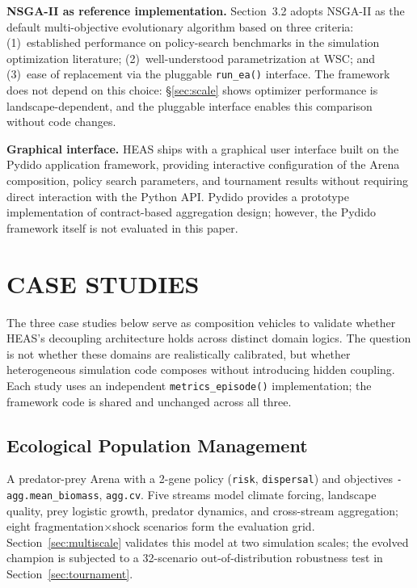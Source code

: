 \documentclass{wscpaperproc}
\begin{document}
\textbf{NSGA-II as reference implementation.} Section~3.2 adopts NSGA-II as the
default multi-objective evolutionary algorithm based on three criteria:
(1)~established performance on policy-search benchmarks in the simulation
optimization literature; (2)~well-understood parametrization at WSC; and
(3)~ease of replacement via the pluggable \texttt{run\_ea()} interface. The
framework does not depend on this choice: \S\ref{sec:scale} shows optimizer performance is landscape-dependent, and the pluggable interface enables this comparison without code changes.

\textbf{Graphical interface.} HEAS ships with a graphical user interface
built on the Pydido application framework, providing interactive configuration
of the Arena composition, policy search parameters, and tournament results
without requiring direct interaction with the Python API.
Pydido provides a prototype implementation of contract-based aggregation design;
however, the Pydido framework itself is not evaluated in this paper.

\section{CASE STUDIES}

The three case studies below serve as composition vehicles to validate whether HEAS's decoupling architecture holds across distinct domain logics. The question is not whether these domains are realistically calibrated, but whether heterogeneous simulation code composes without introducing hidden coupling. Each study uses an independent \texttt{metrics\_episode()} implementation; the framework code is shared and unchanged across all three.

\subsection{Ecological Population Management}

A predator-prey Arena with a 2-gene policy (\texttt{risk},
\texttt{dispersal}) and objectives \texttt{-agg.mean\_biomass},
\texttt{agg.cv}. Five streams model climate forcing, landscape quality, prey
logistic growth, predator dynamics, and cross-stream aggregation; eight
fragmentation$\times$shock scenarios form the evaluation grid.
Section~\ref{sec:multiscale} validates this model at two simulation scales; the evolved champion
is subjected to a 32-scenario out-of-distribution robustness test in
Section~\ref{sec:tournament}.
\end{document}
